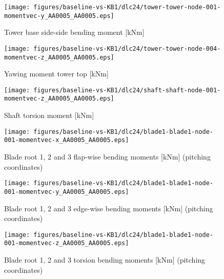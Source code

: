 \begin{figure}[!ht]
\begin{center}
	\texttt{[image: figures/baseline-vs-KB1/dlc24/tower-tower-node-001-momentvec-y\_AA0005\_AA0005.eps]}
\end{center}
\caption{Tower base side-side bending moment [kNm]}
\label{fig:baseline-vs-KB1:dlc24:tower-base-ss}
\end{figure}

\begin{figure}[!ht]
\begin{center}
	\texttt{[image: figures/baseline-vs-KB1/dlc24/tower-tower-node-004-momentvec-z\_AA0005\_AA0005.eps]}
\end{center}
\caption{Yawing moment tower top [kNm]}
\label{fig:baseline-vs-KB1:dlc24:tower-top-yaw}
\end{figure}

\begin{figure}[!ht]
\begin{center}
	\texttt{[image: figures/baseline-vs-KB1/dlc24/shaft-shaft-node-001-momentvec-z\_AA0005\_AA0005.eps]}
\end{center}
\caption{Shaft torsion moment [kNm]}
\label{fig:baseline-vs-KB1:dlc24:shaft-torsion}
\end{figure}

\begin{figure}[!ht]
\begin{center}
	\texttt{[image: figures/baseline-vs-KB1/dlc24/blade1-blade1-node-001-momentvec-x\_AA0005\_AA0005.eps]}
\end{center}
\caption{Blade root 1, 2 and 3 flap-wise bending moments [kNm] (pitching coordinates)}
\label{fig:baseline-vs-KB1:dlc24:blade-root-flap}
\end{figure}

\begin{figure}[!ht]
\begin{center}
	\texttt{[image: figures/baseline-vs-KB1/dlc24/blade1-blade1-node-001-momentvec-y\_AA0005\_AA0005.eps]}
\end{center}
\caption{Blade root 1, 2 and 3 edge-wise bending moments [kNm] (pitching coordinates)}
\label{fig:baseline-vs-KB1:dlc24:blade-root-edge}
\end{figure}

\begin{figure}[!ht]
\begin{center}
	\texttt{[image: figures/baseline-vs-KB1/dlc24/blade1-blade1-node-001-momentvec-z\_AA0005\_AA0005.eps]}
\end{center}
\caption{Blade root 1, 2 and 3 torsion bending moments [kNm] (pitching coordinates)}
\label{fig:baseline-vs-KB1:dlc24:blade-root-torsion}
\end{figure}

